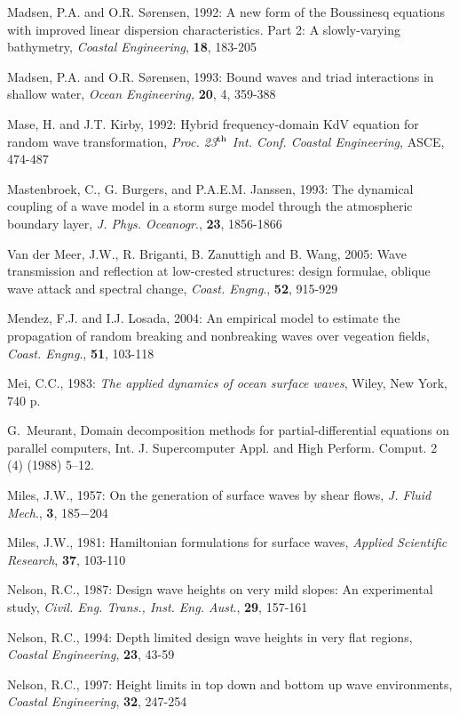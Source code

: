 \documentclass[12pt]{book}
\begin{document}
\begin{thebibliography}{10}
Madsen, P.A. and O.R. S{\o}rensen, 1992: A new form of the Boussinesq equations with improved linear
dispersion characteristics. Part 2: A slowly-varying bathymetry, {\it Coastal Engineering}, {\bf 18}, 183-205

Madsen, P.A. and O.R. S{\o}rensen, 1993: Bound waves and triad interactions in shallow water, {\it Ocean
Engineering,} {\bf 20}, 4, 359-388

Mase, H. and J.T. Kirby, 1992: Hybrid frequency-domain KdV equation for random wave transformation,
{\it Proc. 23$^{{\rm th}}$ Int. Conf. Coastal Engineering}, ASCE, 474-487

Mastenbroek, C., G. Burgers, and P.A.E.M. Janssen, 1993: The dynamical coupling of a wave model in
a storm surge model through the atmospheric boundary layer, {\it J. Phys. Oceanogr}., {\bf 23}, 1856-1866

Van der Meer, J.W., R. Briganti, B. Zanuttigh and B. Wang, 2005: Wave transmission and reflection at
low-crested structures: design formulae, oblique wave attack and spectral change,
{\it Coast. Engng}., {\bf 52}, 915-929

Mendez, F.J. and I.J. Losada, 2004: An empirical model to estimate the propagation of random breaking and
nonbreaking waves over vegeation fields, {\it Coast. Engng}., {\bf 51}, 103-118

Mei, C.C., 1983: {\it The applied dynamics of ocean surface waves}, Wiley, New York, 740 p.

G.~Meurant, Domain decomposition methods for partial-differential equations on
  parallel computers, Int. J. Supercomputer Appl. and High Perform. Comput. 2
  (4) (1988) 5--12.

Miles, J.W., 1957: On the generation of surface waves by shear flows, {\it J. Fluid Mech}., {\bf 3}, 185$-$204

Miles, J.W., 1981: Hamiltonian formulations for surface waves, {\it Applied Scientific Research}, {\bf 37}, 103-110

Nelson, R.C., 1987: Design wave heights on very mild slopes: An experimental study, {\it Civil. Eng. Trans.,
Inst. Eng. Aust}., {\bf 29}, 157-161

Nelson, R.C., 1994: Depth limited design wave heights in very flat regions, {\it Coastal Engineering}, {\bf 23}, 43-59

Nelson, R.C., 1997: Height limits in top down and bottom up wave environments, {\it Coastal Engineering},
{\bf 32}, 247-254


\end{thebibliography}
\end{document}
